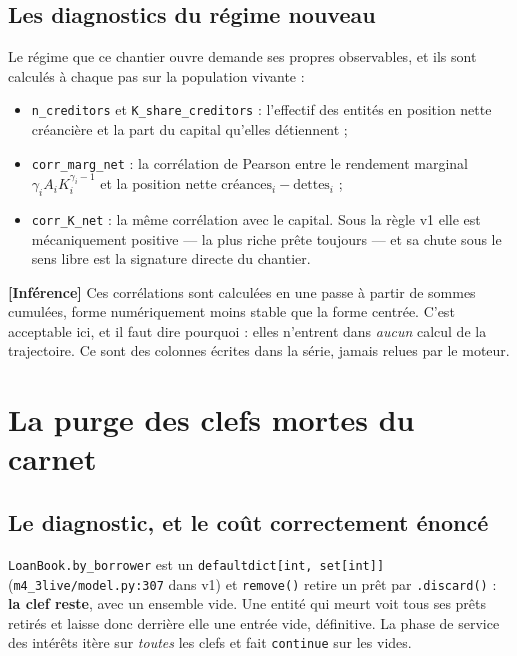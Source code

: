 \documentclass[11pt,a4paper]{article}
\newcommand{\code}[1]{\texttt{#1}}
\newcommand{\inference}{\textbf{[Inférence]}}
\begin{document}
\subsection{Les diagnostics du régime nouveau}

Le régime que ce chantier ouvre demande ses propres observables, et ils sont
calculés à chaque pas sur la population vivante :

\begin{itemize}
\item \code{n\_creditors} et \code{K\_share\_creditors} : l'effectif des
  entités en position nette créancière et la part du capital qu'elles
  détiennent ;
\item \code{corr\_marg\_net} : la corrélation de Pearson entre le rendement
  marginal $\gamma_i A_i K_i^{\gamma_i-1}$ et la position nette
  $\text{créances}_i - \text{dettes}_i$ ;
\item \code{corr\_K\_net} : la même corrélation avec le capital. Sous la règle
  v1 elle est mécaniquement positive --- la plus riche prête toujours --- et sa
  chute sous le sens libre est la signature directe du chantier.
\end{itemize}

\inference{} Ces corrélations sont calculées en une passe à partir de sommes
cumulées, forme numériquement moins stable que la forme centrée. C'est
acceptable ici, et il faut dire pourquoi : elles n'entrent dans \emph{aucun}
calcul de la trajectoire. Ce sont des colonnes écrites dans la série, jamais
relues par le moteur.

\section{La purge des clefs mortes du carnet}
\label{sec:purge}

\subsection{Le diagnostic, et le coût correctement énoncé}

\code{LoanBook.by\_borrower} est un \code{defaultdict[int, set[int]]}
(\code{m4\_3live/model.py:307} dans v1) et \code{remove()} retire un prêt par
\code{.discard()} : \textbf{la clef reste}, avec un ensemble vide. Une entité
qui meurt voit tous ses prêts retirés et laisse donc derrière elle une entrée
vide, définitive. La phase de service des intérêts itère sur \emph{toutes} les
clefs et fait \code{continue} sur les vides.
\end{document}
